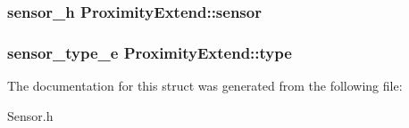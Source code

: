 \subsubsection[{sensor}]{\setlength{\rightskip}{0pt plus 5cm}sensor\-\_\-h Proximity\-Extend\-::sensor}\label{structProximityExtend_a485fb40b759300548e8bd3fd71812dfb}
\subsubsection[{type}]{\setlength{\rightskip}{0pt plus 5cm}sensor\-\_\-type\-\_\-e Proximity\-Extend\-::type}\label{structProximityExtend_ab777050f6cb4c5adc673c65824a65ebb}


The documentation for this struct was generated from the following file\-:\begin{DoxyCompactItemize}
\item 
Sensor.\-h\end{DoxyCompactItemize}
